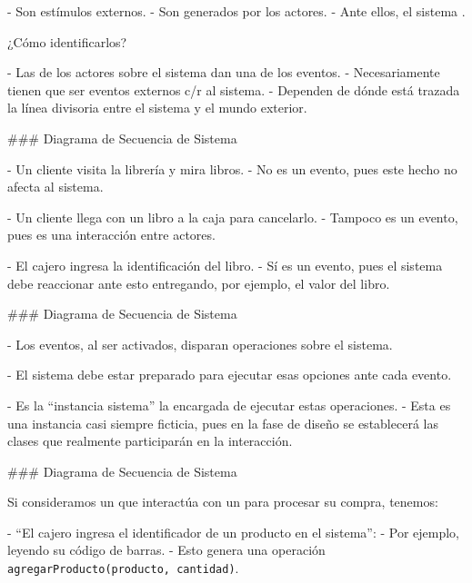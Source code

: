 
- Son estímulos externos.
- Son generados por los actores.
- Ante ellos, el sistema .

\pause

\vfill

¿Cómo identificarlos?

- Las  de los actores sobre el sistema dan una  de los eventos.
- Necesariamente tienen que ser eventos externos c/r al sistema.
- Dependen de dónde está trazada la línea divisoria entre el sistema y el mundo exterior.

### Diagrama de Secuencia de Sistema


- Un cliente visita la librería y mira libros.
    - No es un evento, pues este hecho no afecta al sistema.

\vfill

- Un cliente llega con un libro a la caja para cancelarlo.
    - Tampoco es un evento, pues es una interacción entre actores.


\vfill

- El cajero ingresa la identificación del libro.
    - Sí es un evento, pues el sistema debe reaccionar ante esto entregando, por ejemplo,
    el valor del libro.

### Diagrama de Secuencia de Sistema


- Los eventos, al ser activados, disparan operaciones sobre el sistema.

\vfill

- El sistema debe estar preparado para ejecutar esas opciones ante cada evento.

\vfill

- Es la ``instancia sistema'' la encargada de ejecutar estas operaciones.
    - Esta es una instancia casi siempre ficticia, pues en la fase de diseño
    se establecerá las clases que realmente participarán en la interacción.

### Diagrama de Secuencia de Sistema


Si consideramos un  que interactúa con un  para procesar su compra,
tenemos:

\vfill

- ``El cajero ingresa el identificador de un producto en el sistema'':
    - Por ejemplo, leyendo su código de barras.
    - Esto genera una operación \texttt{agregarProducto(producto, cantidad)}.


